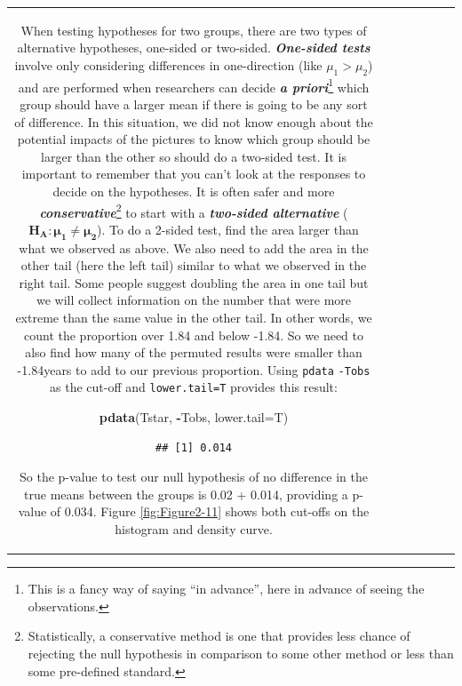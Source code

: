 \documentclass[]{book}
\newenvironment{Shaded}{\begin{snugshade}}{\end{snugshade}}
\newcommand{\KeywordTok}[1]{\textcolor[rgb]{0.13,0.29,0.53}{\textbf{#1}}}
\newcommand{\DataTypeTok}[1]{\textcolor[rgb]{0.13,0.29,0.53}{#1}}
\newcommand{\OperatorTok}[1]{\textcolor[rgb]{0.81,0.36,0.00}{\textbf{#1}}}
\newcommand{\NormalTok}[1]{#1}
\let\rmarkdownfootnote\footnote%
\def\footnote{\protect\rmarkdownfootnote}
\theoremstyle{definition}
\theoremstyle{definition}
\theoremstyle{remark}
\begin{document}
\begin{longtable}[]{@{}ccccccc@{}}
\begin{minipage}[b]{0.10\columnwidth}
When testing hypotheses for two groups, there are two types of
alternative hypotheses, one-sided or two-sided. \textbf{\emph{One-sided
tests}} involve only considering differences in one-direction (like
\(\mu_1 > \mu_2\)) and are performed when researchers can decide
\textbf{\emph{a priori}}\footnote{This is a fancy way of saying ``in
  advance'', here in advance of seeing the observations.} which group
should have a larger mean if there is going to be any sort of
difference. In this situation, we did not know enough about the
potential impacts of the pictures to know which group should be larger
than the other so should do a two-sided test. It is important to
remember that you can't look at the responses to decide on the
hypotheses. It is often safer and more
\textbf{\emph{conservative}}\footnote{Statistically, a conservative
  method is one that provides less chance of rejecting the null
  hypothesis in comparison to some other method or less than some
  pre-defined standard.} to start with a \textbf{\emph{two-sided
alternative}} (\(\mathbf{H_A: \mu_1 \ne \mu_2}\)). To do a 2-sided test,
find the area larger than what we observed as above. We also need to add
the area in the other tail (here the left tail) similar to what we
observed in the right tail. Some people suggest doubling the area in one
tail but we will collect information on the number that were more
extreme than the same value in the other tail. In other words, we count
the proportion over 1.84 and below -1.84. So we need to also find how
many of the permuted results were smaller than -1.84years to add to our
previous proportion. Using \texttt{pdata} \texttt{-Tobs} as the cut-off
and \texttt{lower.tail=T} provides this result:

\begin{Shaded}
\begin{Highlighting}[]
\KeywordTok{pdata}\NormalTok{(Tstar, }\OperatorTok{-}\NormalTok{Tobs, }\DataTypeTok{lower.tail=}\NormalTok{T)}
\end{Highlighting}
\end{Shaded}

\begin{verbatim}
## [1] 0.014
\end{verbatim}

So the p-value to test our null hypothesis of no difference in the true
means between the groups is 0.02 + 0.014, providing a p-value of 0.034.
Figure \ref{fig:Figure2-11} shows both cut-offs on the histogram and
density curve.






\end{minipage}
\end{longtable}
\end{document}
